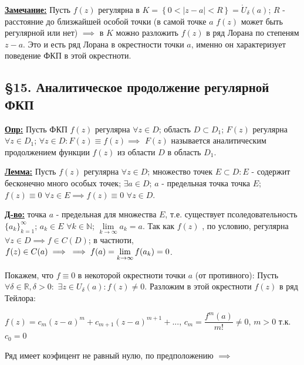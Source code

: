 \documentclass[a4paper, 12pt]{article}
\begin{document}
  \quad \textbf{\underline{Замечание:}} Пусть $f(z)$ регулярна в $K = \left\{ 0 < |z - a| < R \right\} = \mathring{U}_{\delta} (a)$; $R$ - расстояние до близжайшей особой точки (в самой точке $a$ $f(z)$ может быть регулярной или нет) $\implies$ в $K$ можно разложить $f(z)$ в ряд Лорана по степеням $z - a$.  Это и есть ряд Лорана в окрестности точки $a$, именно он характеризует поведение ФКП в этой окрестноти.

  \begin{center}
    \subsection*{\S15. Аналитическое продолжение регулярной ФКП }
  \end{center}

  \quad \textbf{\underline{Опр:}} Пусть ФКП $f(z)$ регулярна $\forall z \in D$; область $D \subset D_1$; $F(z)$ регулярна $\forall z \in D_1$; $\forall z \in D : F(z) \equiv f(z) \implies$ $F(z)$ называется аналитическим продолжением функции $f(z)$ из области $D$ в область $D_1$.

  \quad \textbf{\underline{Лемма:}} Пусть $f(z)$ регулярна $ \forall z \in D$; множество точек $E \subset D : E$ - содержит бесконечно много особых точек; $\exists a \in D$; $a$ - предельная точка точка $E$; $f(z) \equiv 0$ $\forall z \in E \implies f(z) \equiv 0 $ $\forall z \in D$. 

  \quad \textbf{\underline{Д-во:}} точка $a$ - предельная для множества $E$, т.е. существует псоледовательность $\{ a_k \}_{k=1}^{\infty}$; $a_k \in E$
 $\forall k \in \mathbb{N}$; $\lim\limits_{k \to \infty} a_k = a$. Так как $f(z)$ , по условию, регулярна $\forall z \in D \implies f \in C(D)$; в частноти, $f(z) \in C(a) \implies \newline \implies f(a) = \lim\limits_{k \to \infty} f(a_k) = 0$.
 
 \quad Покажем, что $f \equiv 0$ в некоторой окрестноти точки $a$ (от противного): Пусть $\forall \delta \in \mathbb{R}, \delta > 0:$ $\exists z \in U_{\delta} (a) : f(z) \neq 0$. Разложим в этой окрестноти $f(z)$ в ряд Тейлора:
 
\begin{center}
	$f(z) = c_m (z-a)^m+ c_{m+1} (z-a)^{m+1} + ...$, $c_m = \dfrac{f^m(a)}{m!} \neq 0$, $m > 0$ т.к. $c_0 = 0$
\end{center}

\quad Ряд имеет коэфицент не равный нулю, по предположению $\implies$ 
\end{document}
